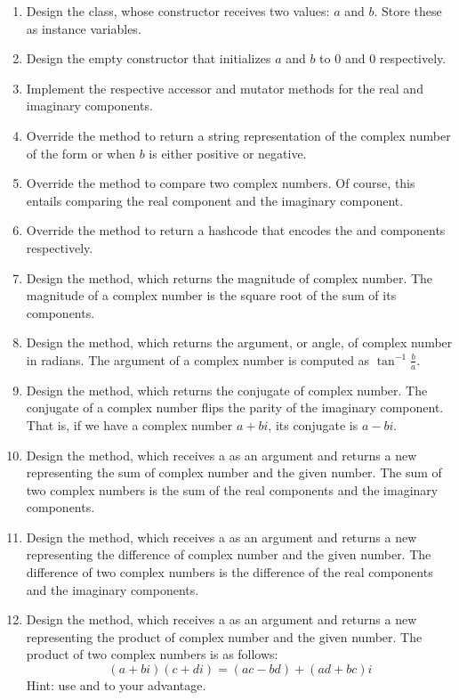 \begin{enumerate}[label=(\alph*)]
    \item Design the  class, whose constructor receives two  values: $a$ and $b$. Store these as instance variables.
    \item Design the empty constructor that initializes $a$ and $b$ to $0$ and $0$ respectively. 
    \item Implement the respective accessor and mutator methods for the real and imaginary components.
    \item Override the  method to return a string representation of the complex number of the form  or  when $b$ is either positive or negative. 
    \item Override the  method to compare two complex numbers. Of course, this entails comparing the real component and the imaginary component.
    \item Override the  method to return a hashcode that encodes the  and  components respectively.
    \item Design the  method, which returns the magnitude of  complex number. The magnitude of a complex number is the square root of the sum of its components.
    \item Design the  method, which returns the argument, or angle, of  complex number in radians. The argument of a complex number is computed as $\tan^{-1}{\frac{b}{a}}$.
    \item Design the  method, which returns the conjugate of  complex number. The conjugate of a complex number flips the parity of the imaginary component. That is, if we have a complex number $a + bi$, its conjugate is $a - bi$.
    \item Design the  method, which receives a  as an argument and returns a new  representing the sum of  complex number and the given number. The sum of two complex numbers is the sum of the real components and the imaginary components.
    \item Design the  method, which receives a  as an argument and returns a new  representing the difference of  complex number and the given number. The difference of two complex numbers is the difference of the real components and the imaginary components.
    \item Design the  method, which receives a  as an argument and returns a new  representing the product of  complex number and the given number. The product of two complex numbers is as follows:
    \[
        (a + bi)(c + di) = (ac - bd) + (ad + bc)i    
    \]
    Hint: use  and  to your advantage.
\end{enumerate}

